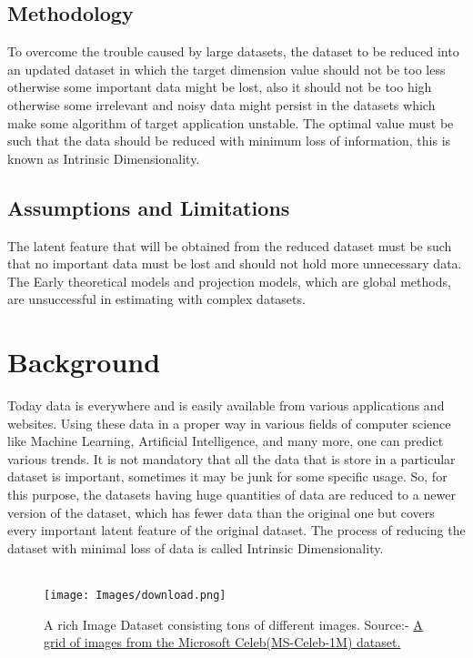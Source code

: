 \documentclass[12pt,letterpaper]{report}
\begin{document}
\section{Methodology}
To overcome the trouble caused by large datasets, the dataset to be reduced into an updated dataset in which the target dimension value should not be too less otherwise some important data might be lost, also it should not be too high otherwise some irrelevant and noisy data might persist in the datasets which make some algorithm of target application unstable. The optimal value must be such that the data should be reduced with minimum loss of information, this is known as Intrinsic Dimensionality\cite{2}. 

\section{Assumptions and Limitations}
The latent feature that will be obtained from the reduced dataset must be such that no important data must be lost and should not hold more unnecessary data. The Early theoretical models and projection models, which are global methods, are unsuccessful in estimating with complex datasets.  


\chapter{Background}

Today data is everywhere and is easily available from various applications and websites. Using these data in a proper way in various fields of computer science like Machine Learning, Artificial Intelligence, and many more, one can predict various trends. It is not mandatory that all the data that is store in a particular dataset is important, sometimes it may be junk for some specific usage. So, for this purpose, the datasets having huge quantities of data are reduced to a newer version of the dataset, which has fewer data than the original one but covers every important latent feature of the original dataset. The process of reducing the dataset with minimal loss of data is called Intrinsic Dimensionality. \\\\



\begin{figure}[h]
    \centering
    \begin{center}
    \texttt{[image: Images/download.png]}    
    \end{center}
    \caption{A rich Image Dataset consisting tons of different images. Source:-  \href{https://unthinking.photography/articles/an-introduction-to-image-datasets}{A grid of images from the Microsoft Celeb(MS-Celeb-1M) dataset.}}
    \label{fig:A Large Image Dataset.}
\end{figure}
\end{document}
